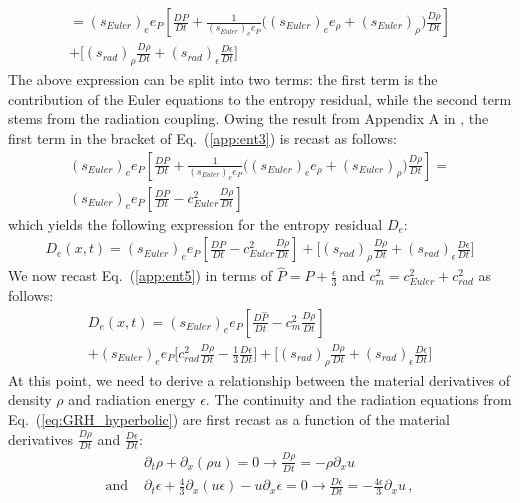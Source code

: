 \documentclass[review]{elsarticle}
\newcommand{\eqt}[1]{Eq.~(\ref{#1})}                     %
\begin{document}
\begin{appendices}
\begin{multline}
= (s_{Euler})_e e_P\left[ \frac{D P}{Dt} + \frac{1}{(s_{Euler})_e e_P}\Big( (s_{Euler})_e e_\rho + (s_{Euler})_\rho \Big) \frac{D \rho}{Dt} \right] \\ 
+ \Big[ (s_{rad})_\rho \frac{D \rho}{Dt} + (s_{rad})_\epsilon \frac{D \epsilon}{Dt} \Big]
\end{multline}
%
The above expression can be split into two terms: the first term is the contribution of the Euler equations to the entropy residual, while the second term stems from the radiation coupling. Owing the result from Appendix A in \cite{Marco_paper_low_mach}, the first term in the bracket of \eqt{app:ent3} is recast as follows:
%
\begin{multline}
(s_{Euler})_e e_P\left[ \frac{D P}{Dt} + \frac{1}{(s_{Euler})_e e_P}\Big( (s_{Euler})_e e_\rho + (s_{Euler})_\rho \Big) \frac{D \rho}{Dt} \right]  = \\ (s_{Euler})_e e_P\left[ \frac{D P}{Dt} -c^2_{Euler} \frac{D \rho}{Dt} \right] \nonumber
\end{multline}
% 
which yields the following expression for the entropy residual $D_e$:
%
\begin{multline}\label{app:ent5}
D_e(x,t) = (s_{Euler})_e e_P\left[ \frac{D P}{Dt} -c^2_{Euler} \frac{D \rho}{Dt} \right] + \Big[ (s_{rad})_\rho \frac{D \rho}{Dt} + (s_{rad})_\epsilon \frac{D \epsilon}{Dt} \Big]
\end{multline}
%
We now recast \eqt{app:ent5} in terms of $\hat{P} = P + \frac{\epsilon}{3}$ and $c^2_m = c^2_{Euler} + c^2_{rad}$ as follows:
%
\begin{multline}\label{app:ent6}
D_e(x,t) = (s_{Euler})_e e_P\left[ \frac{D \hat{P}}{Dt} - c^2_m \frac{D \rho}{Dt} \right] \\ + (s_{Euler})_e e_P \Big[ c^2_{rad}\frac{D \rho}{Dt} - \frac{1}{3}\frac{D \epsilon}{Dt} \Big] +  \Big[ (s_{rad})_\rho \frac{D \rho}{Dt} + (s_{rad})_\epsilon \frac{D \epsilon}{Dt} \Big]
\end{multline}
%
At this point, we need to derive a relationship between the material derivatives of density $\rho$ and radiation energy $\epsilon$. The continuity and the radiation equations from \eqt{eq:GRH_hyperbolic} are first recast as a function of the material derivatives $\frac{D \rho}{D t}$ and $\frac{D \epsilon}{D t}$:
%
\begin{align}
&\partial_t \rho +  \partial_x (\rho u) = 0 \rightarrow \frac{D \rho}{D t} = - \rho \partial_x u \nonumber \\
\text{and }
&\partial_t \epsilon + \frac{4}{3}\partial_x (u \epsilon) - u \partial_x \epsilon = 0 \rightarrow \frac{D \epsilon}{D t} = -\frac{4 \epsilon}{3} \partial_x u \, , \nonumber

\end{align}
\end{appendices}
\end{document}
